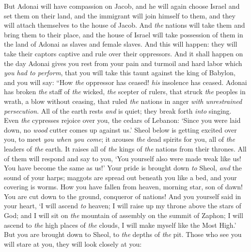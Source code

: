 \begin{biblechapter} %
 But Adonai will have compassion on Jacob, 
and he will again choose Israel 
and set them on their land, 
and the immigrant will join himself to them, 
and they will attach themselves to the house of Jacob.
\verse And \textit{the} nations will take them 
and bring them to their place, 
and the house of Israel will take possession of them in the land of Adonai 
as slaves and female slaves. And this will happen: they will take their captors captive 
and rule over their oppressors.
 And it shall happen on the day Adonai gives you rest from your pain and turmoil and hard labor which \textit{you had to perform},
\verse that you will take this taunt against the king of Babylon, 
and you will say: 
“How \textit{the} oppressor has ceased! 
\textit{his} insolence has ceased.
\verse Adonai has broken \textit{the} staff of \textit{the} wicked, 
\textit{the} scepter of rulers,
\verse that struck \textit{the} peoples in wrath, a blow without ceasing, 
that ruled \textit{the} nations in anger 
\textit{with unrestrained persecution}.
\verse All of the earth rests \textit{and} is quiet; 
they break forth \textit{into} singing.
\verse Even \textit{the} cypresses rejoice over you, 
the cedars of Lebanon: 
‘Since you were laid down, 
no \textit{wood} cutter comes up against us.’
\verse Sheol below is getting excited over you, 
to meet \textit{you when you come}; 
it arouses \textit{the} dead spirits for you, 
all of \textit{the} leaders of \textit{the} earth. 
It raises all of \textit{the} kings of \textit{the} nations from their thrones.
\verse All of them will respond and say to you, 
‘You yourself also were made weak like us! 
You have become the same as us!’
\verse Your pride is brought down \textit{to} Sheol, 
\textit{and} the sound of your harps; 
maggots are spread out beneath you like a bed, 
and your covering is worms.
\verse How you have fallen from heaven, morning star, son of dawn! 
You are cut down to the ground, conqueror of nations!
\verse And you yourself said in your heart,
\verse ‘I will ascend \textit{to} heaven; 
I will raise up my throne above the stars of God; 
and I will sit on \textit{the} mountain of assembly 
on the summit of Zaphon;
\verse I will ascend to \textit{the} high places of \textit{the} clouds, 
I will make myself like the Most High.’
\verse But you are brought down to Sheol, 
to \textit{the} depths of \textit{the} pit.
\verse Those who see you will stare at you, 
they will look closely at you: 

\end{biblechapter}
